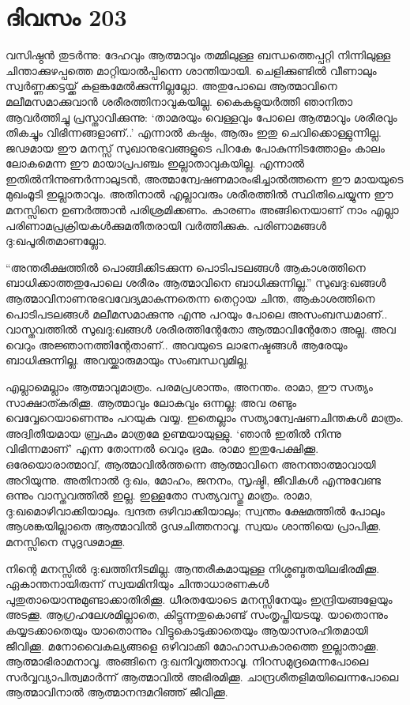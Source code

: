 \section{ദിവസം 203}


വസിഷ്ഠൻ തുടർന്നു: ദേഹവും ആത്മാവും തമ്മിലുള്ള ബന്ധത്തെപ്പറ്റി നിന്നിലുള്ള ചിന്താക്കുഴപ്പത്തെ മാറ്റിയാൽപ്പിന്നെ ശാന്തിയായി. ചെളിക്കുണ്ടിൽ വീണാലും സ്വർണ്ണക്കട്ടയ്ക്ക് കളങ്കമേൽക്കുന്നില്ലല്ലോ. അതുപോലെ ആത്മാവിനെ മലീമസമാക്കുവാൻ ശരീരത്തിനാവുകയില്ല. കൈകളുയർത്തി ഞാനിതാ ആവർത്തിച്ചു പ്രസ്താവിക്കുന്നു: ‘താമരയും വെള്ളവും പോലെ ആത്മാവും ശരീരവും തികച്ചും വിഭിന്നങ്ങളാണ്‌..’ എന്നാൽ കഷ്ഠം, ആരും ഇതു ചെവിക്കൊള്ളുന്നില്ല. ജഢമായ ഈ മനസ്സ് സുഖാനുഭവങ്ങളുടെ പിറകേ പോകുന്നിടത്തോളം കാലം ലോകമെന്ന ഈ മായാപ്രപഞ്ചം ഇല്ലാതാവുകയില്ല. എന്നാൽ ഇതിൽനിന്നുണർന്നാലുടൻ, അത്മാന്വേഷണമാരംഭിച്ചാൽത്തന്നെ ഈ മായയുടെ മുഖംമൂടി ഇല്ലാതാവും. അതിനാൽ എല്ലാവരും ശരീരത്തിൽ സ്ഥിതിചെയ്യുന്ന ഈ മനസ്സിനെ ഉണർത്താൻ പരിശ്രമിക്കണം. കാരണം അങ്ങിനെയാണ്‌ നാം എല്ലാ പരിണാമപ്രക്രിയകൾക്കുമതീതരായി വർത്തിക്കുക. പരിണാമങ്ങൾ ദു:ഖപൂരിതമാണല്ലോ.

“അന്തരീക്ഷത്തിൽ പൊങ്ങിക്കിടക്കുന്ന പൊടിപടലങ്ങൾ ആകാശത്തിനെ ബാധിക്കാത്തതുപോലെ ശരീരം ആത്മാവിനെ ബാധിക്കുന്നില്ല.” സുഖദു:ഖങ്ങൾ ആത്മാവിനാണനുഭവവേദ്യമാകുന്നതെന്ന തെറ്റായ ചിന്ത, ആകാശത്തിനെ പൊടിപടലങ്ങൾ മലീമസമാക്കുന്നു എന്നു പറയും പോലെ അസംബന്ധമാണ്‌.. വാസ്തവത്തിൽ സുഖദു:ഖങ്ങൾ ശരീരത്തിന്റേതോ ആത്മാവിന്റേതോ അല്ല. അവ വെറും അജ്ഞാനത്തിന്റേതാണ്‌.. അവയുടെ ലാഭനഷ്ടങ്ങൾ ആരേയും ബാധിക്കുന്നില്ല. അവയ്ക്കാരുമായും സംബന്ധവുമില്ല.

എല്ലാമെല്ലാം ആത്മാവുമാത്രം. പരമപ്രശാന്തം, അനന്തം. രാമാ, ഈ സത്യം സാക്ഷാത്കരിക്കൂ. ആത്മാവും ലോകവും ഒന്നല്ല; അവ രണ്ടും വെവ്വേറെയാണെന്നും പറയുക വയ്യ. ഇതെല്ലാം സത്യാന്വേഷണചിന്തകൾ മാത്രം. അദ്വിതീയമായ ബ്രഹ്മം മാത്രമേ ഉണ്മയായുള്ളു. ‘ഞാൻ ഇതിൽ നിന്നു വിഭിന്നമാണ്‌’ എന്ന തോന്നൽ വെറും ഭ്രമം. രാമാ ഇതുപേക്ഷിക്കൂ. ഒരേയൊരാത്മാവ്, ആത്മാവിൽത്തന്നെ ആത്മാവിനെ അനന്താത്മാവായി അറിയുന്നു. അതിനാൽ ദു:ഖം, മോഹം, ജനനം, സൃഷ്ടി, ജീവികള്‍ എന്നുവേണ്ട ഒന്നും വാസ്തവത്തില്‍ ഇല്ല. ഇള്ളതോ സത്യവസ്തു മാത്രം. രാമാ, ദു:ഖമൊഴിവാക്കിയാലും. ദ്വന്ദത ഒഴിവാക്കിയാലും; സ്വന്തം ക്ഷേമത്തിൽ പോലും ആശങ്കയില്ലാതെ ആത്മാവിൽ ദൃഢചിത്തനാവൂ. സ്വയം ശാന്തിയെ പ്രാപിക്കൂ. മനസ്സിനെ സുദൃഢമാക്കൂ.

നിന്റെ മനസ്സിൽ ദു:ഖത്തിനിടമില്ല. ആന്തരീകമായുള്ള നിശ്ശബ്ദതയിലഭിരമിക്കൂ. ഏകാന്തനായിരുന്ന് സ്വയമിനിയും ചിന്താധാരണകള്‍  പുതുതായൊന്നുമുണ്ടാക്കാതിരിക്കൂ. ധീരതയോടെ മനസ്സിനേയും ഇന്ദ്രിയങ്ങളേയും അടക്കൂ. ആഗ്രഹലേശമില്ലാതെ, കിട്ടുന്നതുകൊണ്ട് സംതൃപ്തിയടയൂ. യാതൊന്നും കയ്യടക്കാതെയും യാതൊന്നും വിട്ടുകൊടുക്കാതെയും ആയാസരഹിതമായി ജീവിക്കൂ. മനോവൈകല്യങ്ങളെ ഒഴിവാക്കി മോഹാന്ധകാരത്തെ ഇല്ലാതാക്കൂ. ആത്മാഭിരാമനാവൂ. അങ്ങിനെ ദു:ഖനിവൃത്തനാവൂ. നിറസമുദ്രമെന്നപോലെ സർവ്വവ്യാപിത്വമാർന്ന് ആത്മാവിൽ അഭിരമിക്കൂ. ചാന്ദ്രശീതളിമയിലെന്നപോലെ ആത്മാവിനാൽ ആത്മാനന്ദമറിഞ്ഞ് ജീവിക്കൂ. 

